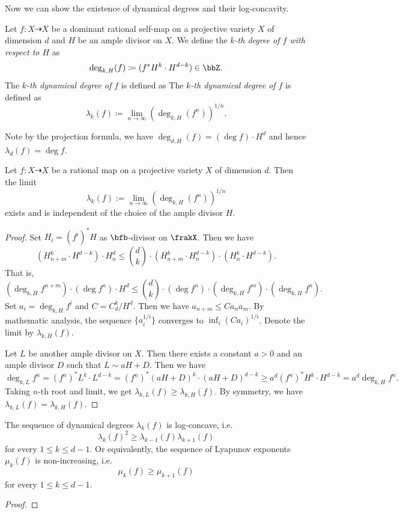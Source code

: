 Now we can show the existence of dynamical degrees and their log-concavity.

\begin{definition}
	Let $f: X \dashrightarrow X$ be a dominant rational self-map on a projective variety $X$ of dimension $d$ and $H$ be an ample divisor on $X$.
	We define the \emph{$k$-th degree of $f$ with respect to $H$} as
	\[ \deg_{k,H}(f) \coloneqq (f^* H^k \cdot H^{d-k}) \in \bbZ. \]
	The \emph{$k$-th dynamical degree of $f$} is defined as
	The \emph{$k$-th dynamical degree of $f$} is defined as
	\[ \lambda_k(f) \coloneqq \lim_{n \to \infty} \left(\deg_{k,H}(f^n)\right)^{1/n}. \]
\end{definition}

Note by the projection formula, we have $\deg_{d,H}(f) = (\deg f) \cdot H^d$ and hence $\lambda_d(f) = \deg f$.

\begin{proposition}
	Let $f: X \dashrightarrow X$ be a rational map on a projective variety $X$ of dimension $d$.
	Then the limit
	\[ \lambda_k(f) := \lim_{n \to \infty} \left(\deg_{k,H}(f^n)\right)^{1/n} \]
	exists and is independent of the choice of the ample divisor $H$.
\end{proposition}
\begin{proof}
	Set $H_i = (f^i)^*H$ as $\bfb$-divisor on $\frakX$.
	Then we have
	\[ (H_{n+m}^k \cdot H^{d-k}) \cdot H_n^d \leq \binom{d}{k} \cdot (H_{n+m}^k \cdot H_n^{d-k}) \cdot (H_n^k \cdot H^{d-k}). \]
	That is,
	\[ (\deg_{k,H} f^{n+m}) \cdot (\deg f^n) \cdot H^d \leq \binom{d}{k} \cdot (\deg f^n) \cdot (\deg_{k,H} f^m) \cdot (\deg_{k,H} f^n). \]
	Set $a_i = \deg_{k,H} f^i$ and $C = C_d^k/H^d$.
	Then we have $a_{n+m} \leq C a_n a_m$.
	By mathematic analysis, the sequence $\{a_i^{1/i}\}$ converges to $\inf_i (Ca_i)^{1/i}$.
	Denote the limit by $\lambda_{k,H}(f)$.

	Let $L$ be another ample divisor on $X$.
	Then there exists a constant $a > 0$ and an ample divisor $D$ such that $L \sim aH + D$.
	Then we have
	\[ \deg_{k,L} f^n = (f^n)^* L^k \cdot L^{d-k} = (f^n)^* (aH + D)^k \cdot (aH + D)^{d-k} \geq a^d (f^n)^* H^k \cdot H^{d-k} = a^d \deg_{k,H} f^n. \]
	Taking $n$-th root and limit, we get $\lambda_{k,L}(f) \geq \lambda_{k,H}(f)$.
	By symmetry, we have $\lambda_{k,L}(f) = \lambda_{k,H}(f)$.
\end{proof}

\begin{proposition}
	The sequence of dynamical degrees $\lambda_k(f)$ is log-concave, i.e.
	\[ \lambda_k(f)^2 \geq \lambda_{k-1}(f) \lambda_{k+1}(f)\]
	for every $1 \leq k \leq d-1$.
	Or equivalently, the sequence of Lyapunov exponents $\mu_k(f)$ is non-increasing, i.e.
	\[ \mu_k(f) \geq \mu_{k+1}(f) \]
	for every $1 \leq k \leq d-1$.
\end{proposition}
\begin{proof}

	\Yang{}
\end{proof}




